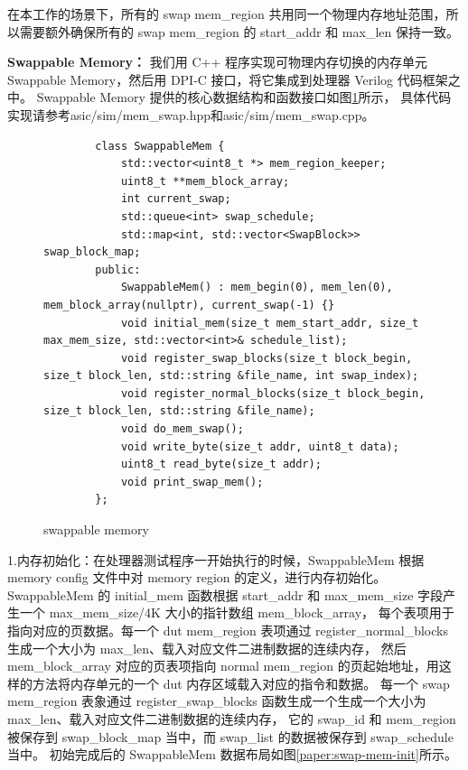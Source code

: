 在本工作的场景下，所有的 swap mem\_region 共用同一个物理内存地址范围，所以需要额外确保所有的 swap mem\_region 的 start\_addr
和 max\_len 保持一致。\par

\textbf{Swappable Memory：}
我们用 C++ 程序实现可物理内存切换的内存单元 Swappable Memory，然后用 DPI-C 接口，将它集成到处理器 Verilog 代码框架之中。
Swappable Memory 提供的核心数据结构和函数接口如图\ref{code:swappable-memory}所示，
具体代码实现请参考asic/sim/mem\_swap.hpp和asic/sim/mem\_swap.cpp。\par

\begin{figure}[htbp]
    \centering
    \begin{verbatim}
        class SwappableMem {
            std::vector<uint8_t *> mem_region_keeper;
            uint8_t **mem_block_array;
            int current_swap;
            std::queue<int> swap_schedule;
            std::map<int, std::vector<SwapBlock>> swap_block_map;
        public:
            SwappableMem() : mem_begin(0), mem_len(0), mem_block_array(nullptr), current_swap(-1) {}
            void initial_mem(size_t mem_start_addr, size_t max_mem_size, std::vector<int>& schedule_list);
            void register_swap_blocks(size_t block_begin, size_t block_len, std::string &file_name, int swap_index);
            void register_normal_blocks(size_t block_begin, size_t block_len, std::string &file_name);
            void do_mem_swap();
            void write_byte(size_t addr, uint8_t data);
            uint8_t read_byte(size_t addr);
            void print_swap_mem();
        };
    \end{verbatim}
    \caption{swappable memory}
    \label{code:swappable-memory}
\end{figure}

1.内存初始化：在处理器测试程序一开始执行的时候，SwappableMem 根据 memory config 文件中对 memory region 的定义，进行内存初始化。
SwappableMem 的 initial\_mem 函数根据 start\_addr 和 max\_mem\_size 字段产生一个 max\_mem\_size/4K 大小的指针数组 mem\_block\_array，
每个表项用于指向对应的页数据。每一个 dut mem\_region 表项通过 register\_normal\_blocks 生成一个大小为 max\_len、载入对应文件二进制数据的连续内存，
然后 mem\_block\_array 对应的页表项指向 normal mem\_region 的页起始地址，用这样的方法将内存单元的一个 dut 内存区域载入对应的指令和数据。
每一个 swap mem\_region 表象通过 register\_swap\_blocks 函数生成一个生成一个大小为 max\_len、载入对应文件二进制数据的连续内存，
它的 swap\_id 和 mem\_region 被保存到 swap\_block\_map 当中，而 swap\_list 的数据被保存到 swap\_schedule 当中。
初始完成后的 SwappableMem 数据布局如图\ref{paper:swap-mem-init}所示。\par

